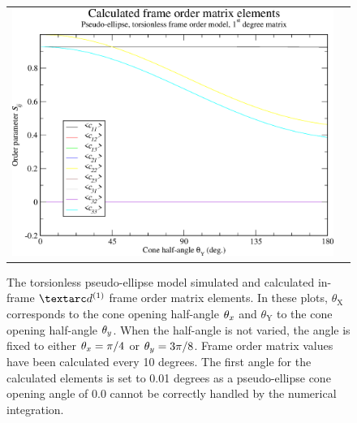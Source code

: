 \begin{figure}
\begin{tabular}{@{}cc@{}}
    \includegraphics[width=.5\textwidth]{images/frame_order_matrix/Sij_pseudo-ellipse_torsionless_in_frame_theta_y_calc.eps} \\
  \end{tabular}
  \caption[Torsionless pseudo-ellipse simulated and calculated in-frame Daeg$^{(1)}$ elements.]{
    The torsionless pseudo-ellipse model simulated and calculated in-frame $\FOone$ frame order matrix elements.
    In these plots, $\theta_\textrm{X}$ corresponds to the cone opening half-angle $\theta_x$ and $\theta_\textrm{Y}$ to the cone opening half-angle $\theta_y$.
    When the half-angle is not varied, the angle is fixed to either $\theta_x = \pi/4$ or $\theta_y = 3\pi/8$.
    Frame order matrix values have been calculated every 10 degrees.
    The first angle for the calculated elements is set to 0.01 degrees as a pseudo-ellipse cone opening angle of 0.0 cannot be correctly handled by the numerical integration.
  }
  \label{fig: simulated and calculated in-frame 1st degree pseudo-ellipse, torsionless frame order}
\end{figure}

